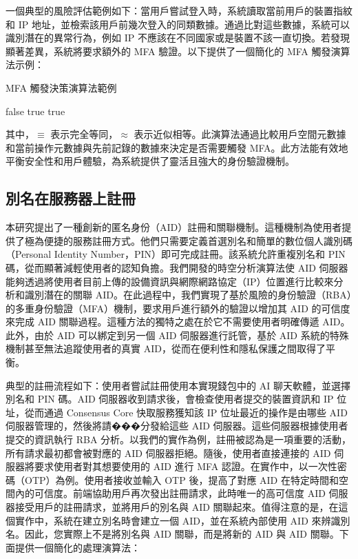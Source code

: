 一個典型的風險評估範例如下：當用戶嘗試登入時，系統讀取當前用戶的裝置指紋和 IP 地址，並檢索該用戶前幾次登入的同類數據。通過比對這些數據，系統可以識別潛在的異常行為，例如 IP 不應該在不同國家或是裝置不該一直切換。若發現顯著差異，系統將要求額外的 MFA 驗證。以下提供了一個簡化的 MFA 觸發演算法示例：

\begin{algorithm}
  \caption{MFA 觸發決策演算法範例}
  \begin{algorithmic}[1]
    \State \Return false
    \Else
    \State \Return true
    \EndIf
    \EndIf
    \State \Return true
    \EndFunction
  \end{algorithmic}
\end{algorithm}

其中，$\equiv$ 表示完全等同，$\approx$ 表示近似相等。此演算法通過比較用戶空間元數據和當前操作元數據與先前記錄的數據來決定是否需要觸發 MFA。此方法能有效地平衡安全性和用戶體驗，為系統提供了靈活且強大的身份驗證機制。

\subsection{別名在服務器上註冊}

本研究提出了一種創新的匿名身份（AID）註冊和關聯機制。這種機制為使用者提供了極為便捷的服務註冊方式。他們只需要定義首選別名和簡單的數位個人識別碼（Personal Identity Number，PIN）即可完成註冊。該系統允許重複別名和 PIN 碼，從而顯著減輕使用者的認知負擔。我們開發的時空分析演算法使 AID 伺服器能夠透過將使用者目前上傳的設備資訊與網際網路協定（IP）位置進行比較來分析和識別潛在的關聯 AID。在此過程中，我們實現了基於風險的身份驗證（RBA）的多重身份驗證（MFA）機制，要求用戶進行額外的驗證以增加其 AID 的可信度來完成 AID 關聯過程。這種方法的獨特之處在於它不需要使用者明確傳遞 AID。此外，由於 AID 可以綁定到另一個 AID 伺服器進行託管，基於 AID 系統的特殊機制甚至無法追蹤使用者的真實 AID，從而在便利性和隱私保護之間取得了平衡。

典型的註冊流程如下：使用者嘗試註冊使用本實現錢包中的 AI 聊天軟體，並選擇別名和 PIN 碼。AID 伺服器收到請求後，會檢查使用者提交的裝置資訊和 IP 位址，從而通過 Consensus Core 快取服務獲知該 IP 位址最近的操作是由哪些 AID 伺服器管理的，然後將請���分發給這些 AID 伺服器。這些伺服器根據使用者提交的資訊執行 RBA 分析。以我們的實作為例，註冊被認為是一項重要的活動，所有請求最初都會被對應的 AID 伺服器拒絕。隨後，使用者直接連接的 AID 伺服器將要求使用者對其想要使用的 AID 進行 MFA 認證。在實作中，以一次性密碼（OTP）為例。使用者接收並輸入 OTP 後，提高了對應 AID 在特定時間和空間內的可信度。前端協助用戶再次發出註冊請求，此時唯一的高可信度 AID 伺服器接受用戶的註冊請求，並將用戶的別名與 AID 關聯起來。值得注意的是，在這個實作中，系統在建立別名時會建立一個 AID，並在系統內部使用 AID 來辨識別名。因此，您實際上不是將別名與 AID 關聯，而是將新的 AID 與 AID 關聯。下面提供一個簡化的處理演算法：

